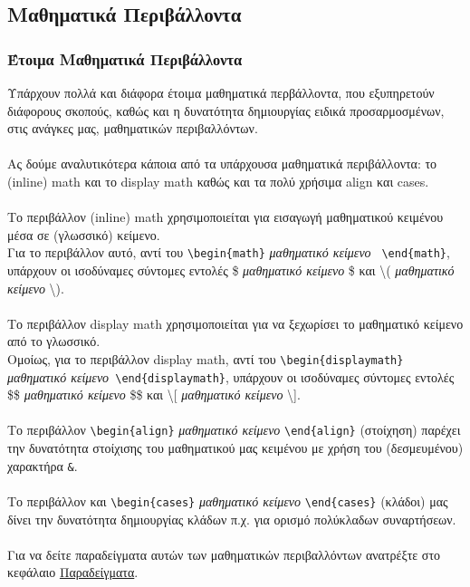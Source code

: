 \documentclass[a4paper, 12pt, oneside, xelatex, final]{article}
\begin{document}
	\subsection{Μαθηματικά Περιβάλλοντα}
	\subsubsection{Έτοιμα Μαθηματικά Περιβάλλοντα}
	\noindent Υπάρχουν πολλά και διάφορα έτοιμα μαθηματικά περβάλλοντα, που εξυπηρετούν διάφορους σκοπούς, καθώς και η δυνατότητα δημιουργίας ειδικά προσαρμοσμένων, στις ανάγκες μας, μαθηματικών περιβαλλόντων.\\ 
	\hfill \\
	Ας δούμε αναλυτικότερα κάποια από τα υπάρχουσα μαθηματικά περιβάλλοντα: το (inline) math και το display math καθώς και τα πολύ χρήσιμα align και cases.\\
	\\
	 Το περιβάλλον (inline) math χρησιμοποιείται για εισαγωγή μαθηματικού κειμένου μέσα σε (γλωσσικό) κείμενο.\\
	 Για το περιβάλλον αυτό, αντί του \verb|\begin{math}| \emph{μαθηματικό κείμενο} \verb+ \end{math}+, υπάρχουν οι ισοδύναμες σύντομες εντολές \$ \emph{μαθηματικό κείμενο} \$ και \textbackslash ( \emph{μαθηματικό κείμενο} \textbackslash). \\
	 \\
	 Το περιβάλλον display math χρησιμοποιείται για να ξεχωρίσει το μαθηματικό κείμενο από το γλωσσικό.\\
	 Ομοίως, για το περιβάλλον display math, αντί του \verb|\begin{displaymath}| \emph{μαθηματικό κείμενο}\newline\verb+ \end{displaymath}+, υπάρχουν οι ισοδύναμες σύντομες εντολές \$\$ \emph{μαθηματικό κείμενο} \$\$ και  \textbackslash[ \emph{μαθηματικό κείμενο} \textbackslash].\\
	 \\
	 Το περιβάλλον \verb+\begin{align}+ \emph{μαθηματικό κείμενο} \verb+\end{align}+ (στοίχηση) παρέχει την δυνατότητα στοίχισης του μαθηματικού μας κειμένου με χρήση του (δεσμευμένου) χαρακτήρα \verb+&+.\\
	 \\
	 Το περιβάλλον και \verb+\begin{cases}+ \emph{μαθηματικό κείμενο} \verb+\end{cases}+ (κλάδοι) μας δίνει την δυνατότητα δημιουργίας κλάδων π.χ. για ορισμό πολύκλαδων συναρτήσεων.\\
	 \\
	 Για να δείτε παραδείγματα αυτών των μαθηματικών περιβαλλόντων ανατρέξτε στο κεφάλαιο \hyperref[Examples]{Παραδείγματα}.
	
\end{document}
